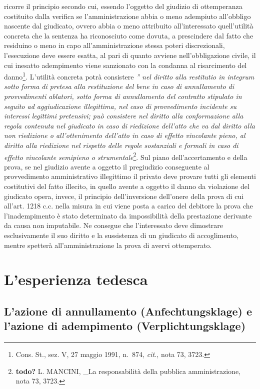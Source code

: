 \documentclass[12pt,it,a4paper,]{report}
\begin{document}
ricorre il principio secondo cui, essendo l'oggetto del giudizio di
ottemperanza costituito dalla verifica se l'amministrazione abbia o meno
adempiuto all'obbligo nascente dal giudicato, ovvero abbia o meno
attribuito all'interessato quell'utilità concreta che la sentenza ha
riconosciuto come dovuta, a prescindere dal fatto che residuino o meno
in capo all'amministrazione stessa poteri discrezionali, l'esecuzione
deve essere esatta, al pari di quanto avviene nell'obbligazione civile,
il cui inesatto adempimento viene sanzionato con la condanna al
risarcimento del danno\footnote{Cons. St., sez. V, 27 maggio 1991,
  n.~874, \emph{cit.}, nota 73, 3723.}. L'utilità concreta potrà
consistere \emph{'' nel diritto alla restitutio in integrum sotto forma
di pretesa alla restituzione del bene in caso di annullamento di
provvedimenti ablatori, sotto forma di annullamento del contratto
stipulato in seguito ad aggiudicazione illegittima, nel caso di
provvedimento incidente su interessi legittimi pretensivi; può
consistere nel diritto alla conformazione alla regola contenuta nel
giudicato in caso di riedizione dell'atto che va dal diritto alla non
riedizione o all'ottenimento dell'atto in caso di effetto vincolante
pieno, al diritto alla riedizione nel rispetto delle regole sostanziali
e formali in caso di effetto vincolante semipieno o
strumentale}\footnote{\textbf{todo?} L. MANCINI, \_La responsabilità
  della pubblica amministrazione, nota 73, 3723.}. Sul piano
dell'accertamento e della prova, se nel giudizio avente a oggetto il
pregiudizio conseguente al provvedimento amministrativo illegittimo il
privato deve provare tutti gli elementi costitutivi del fatto illecito,
in quello avente a oggetto il danno da violazione del giudicato opera,
invece, il principio dell'inversione dell'onere della prova di cui
all'art. 1218 c.c. nella misura in cui viene posta a carico del debitore
la prova che l'inadempimento è stato determinato da impossibilità della
prestazione derivante da causa non imputabile. Ne consegue che
l'interessato deve dimostrare esclusivamente il suo diritto e la
sussistenza di un giudicato di accoglimento, mentre spetterà
all'amministrazione la prova di avervi ottemperato.

\hypertarget{lesperienza-tedesca}{%
\chapter{L'esperienza tedesca}\label{lesperienza-tedesca}}

\hypertarget{lazione-di-annullamento-anfechtungsklage-e-lazione-di-adempimento-verplichtungsklage}{%
\section{L'azione di annullamento (Anfechtungsklage) e l'azione di
adempimento
(Verplichtungsklage)}\label{lazione-di-annullamento-anfechtungsklage-e-lazione-di-adempimento-verplichtungsklage}}
\end{document}
